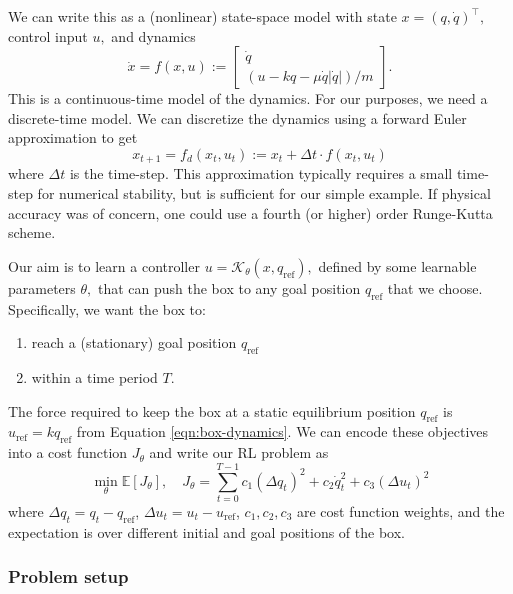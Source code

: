 We can write this as a (nonlinear) state-space model with state $x = (q,\dot{q})^\top,$ control input $u,$ and dynamics
\begin{equation}
\dot{x} = f(x,u) := \begin{bmatrix}
\dot{q} \\ (u - kq - \mu \dot{q}|\dot{q}|)/m
\end{bmatrix}.
\end{equation}
This is a continuous-time model of the dynamics. For our purposes, we need a discrete-time model. We can discretize the dynamics using a forward Euler approximation to get
\begin{equation}
x_{t+1} = f_d(x_t,u_t) := x_t + \Delta t \cdot f(x_t, u_t)
\end{equation}
where $\Delta t$ is the time-step. This approximation typically requires a small time-step for numerical stability, but is sufficient for our simple example. If physical accuracy was of concern, one could use a fourth (or higher) order Runge-Kutta scheme.

Our aim is to learn a controller $u = \mathcal{K}_\theta(x, q_\mathrm{ref}),$ defined by some learnable parameters $\theta,$ that can push the box to any goal position $q_\mathrm{ref}$ that we choose. Specifically, we want the box to:
\begin{enumerate}
    \item reach a (stationary) goal position $q_\mathrm{ref}$
    \item within a time period $T$.
\end{enumerate}
The force required to keep the box at a static equilibrium position $q_\mathrm{ref}$ is $u_\mathrm{ref} = k q_\mathrm{ref}$ from Equation \ref{eqn:box-dynamics}. We can encode these objectives into a cost function $J_\theta$ and write our RL problem as
\begin{equation} \label{eqn:rl-costfunc}
\min_\theta \mathbb{E} \left[ J_\theta \right],
\quad
J_\theta = \sum_{t=0}^{T-1} c_1 (\Delta q_t)^2 + c_2 \dot{q}_t^2 + c_3 (\Delta u_t)^2
\end{equation}
where $\Delta q_t = q_t - q_\mathrm{ref}$, $\Delta u_t = u_t - u_\mathrm{ref}$, $c_1, c_2, c_3$ are cost function weights, and the expectation is over different initial and goal positions of the box.


\subsubsection{Problem setup} \label{sec:rl-setup}

